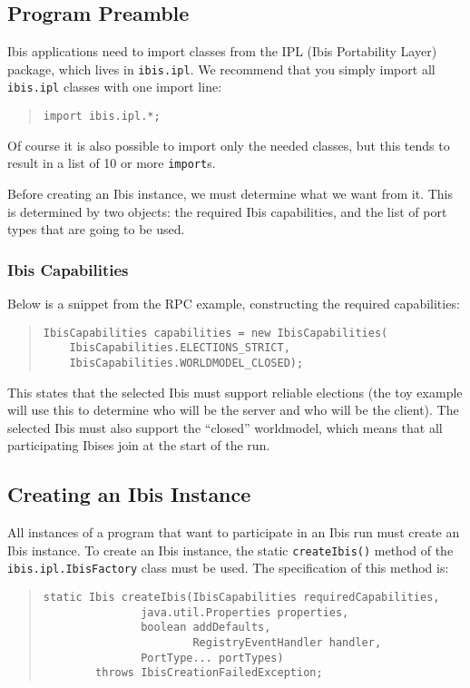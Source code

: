 \documentclass[10pt]{article}
\newcommand{\mysubsection}[1]{\subsection{#1}\label{#1}}
\newcommand{\mysubsubsection}[1]{\subsubsection{#1}\label{#1}}
\begin{document}
\subsection{Program Preamble}

Ibis applications need to import classes from the IPL (Ibis
Portability Layer) package, which lives in
\texttt{ibis.ipl}.
We recommend that you simply import all \texttt{ibis.ipl} classes with
one import line:

{\small
\begin{quote}
\begin{verbatim}
import ibis.ipl.*;
\end{verbatim}
\end{quote}
}

\noindent
Of course it is also possible to import only the needed classes, but
this tends to result in a list of 10 or more \texttt{import}s.

Before creating an Ibis instance, we must determine what we want from it.
This is determined by two objects: the required Ibis capabilities, and
the list of port types that are going to be used.

\mysubsubsection{Ibis Capabilities}

Below is a snippet from the RPC example, constructing the required capabilities:
{\small
\begin{quote}
\begin{verbatim}
IbisCapabilities capabilities = new IbisCapabilities(
    IbisCapabilities.ELECTIONS_STRICT,
    IbisCapabilities.WORLDMODEL_CLOSED);
\end{verbatim}
\end{quote}
}

This states that the selected Ibis must support reliable elections
(the toy example will use this to determine who will be the server and
who will be the client). The selected Ibis
must also support the ``closed'' worldmodel, which means
that all participating Ibises join at the start of the run.

\mysubsection{Creating an Ibis Instance}

All instances of a program that want to participate in an Ibis run
must create an Ibis instance.
To create an Ibis instance, the static \texttt{createIbis()} method of the
\texttt{ibis.ipl.IbisFactory} class must be used.
The specification of this method is:
{\small
\begin{quote}
\begin{verbatim}
static Ibis createIbis(IbisCapabilities requiredCapabilities,
		       java.util.Properties properties,
		       boolean addDefaults,
                       RegistryEventHandler handler,
		       PortType... portTypes)
        throws IbisCreationFailedException;
\end{verbatim}
\end{quote}
}
\end{document}
